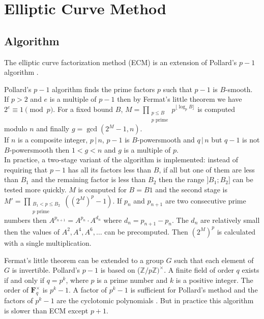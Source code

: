 \documentclass[a4paper, 11pt, pdftex]{report}
\theoremstyle{plain}
\theoremstyle{definition}
\begin{document}
\chapter{Elliptic Curve Method}

\section{Algorithm}

The elliptic curve factorization method (ECM) is an extension of Pollard's $p - 1$ algorithm
\cite{Pollard1}.

Pollard's $p - 1$ algorithm finds the prime factors $p$ such that $p - 1$ is $B$-smooth.\\
If $p > 2$ and $e$ is a multiple of $p - 1$ then by Fermat's little theorem we have
$2^e \equiv 1  \pmod{p}$. For a fixed bound $B$,
$M = \prod_{\substack{p \le B\\ p \text{ prime}}} p^{ \lfloor \log_p{B} \rfloor }$
is computed modulo $n$ and finally $g = \gcd(2^M - 1, n)$.\\ If $n$ is a composite integer,
$p\, |\, n$, $p - 1$ is $B$-powersmooth and $q\, |\, n$ but $q - 1$ is not $B$-powersmooth
then $ 1 < g < n$ and $g$ is a multiple of $p$.\\
In practice, a two-stage variant of the algorithm is implemented: instead of requiring that
$p - 1$ has all its factors less than $B$, if all but one of them are less than $B_1$ and
the remaining factor is less than $B_2$ then the range $]B_1; B_2]$ can be tested more quickly.
$M$ is computed for $B = B1$ and the second stage is
$M' = \prod_{\substack{B_1 < p \le B_2\\ p \text{ prime}}} \left((2^M)^p - 1 \right)$.
If $p_n$ and $p_{n+1}$ are two consecutive prime numbers then $A^{p_{n+1}} = A^{p_n} \cdot A^{d_n}$
where $d_n = p_{n+1} - p_n$. The $d_n$ are relatively small then the values of $A^2, A^4, A^6, \ldots$
can be precomputed. Then $\left(2^M \right)^p$ is calculated with a single multiplication. 

Fermat's little theorem can be extended to a group $G$ such that each element of $G$ is invertible. 
Pollard's $p - 1$ is based on ($\mathbb{Z}/p\mathbb{Z})^\times$.  A finite field of order $q$ exists
if and only if $q = p^k$, where $p$ is a prime number and $k$ is a positive integer. The order of
$\mathbf{F}_q^\times$ is $p^k - 1$. A factor of $p^k - 1$ is sufficient for Pollard's method and
the factors of $p^k - 1$ are the cyclotomic polynomials \cite{BachShallit1}. But in practice
this algorithm is slower than ECM except $p + 1$.
\end{document}
